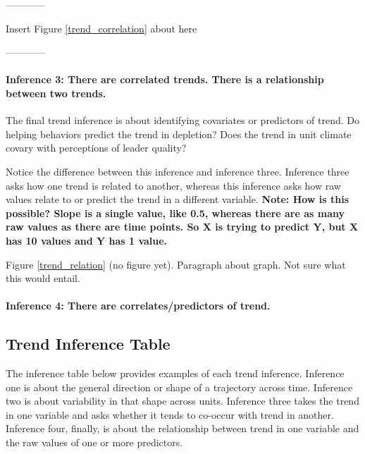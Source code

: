 \documentclass[english,,man]{apa6}
\let\oldparagraph\paragraph
\renewcommand{\paragraph}[1]{\oldparagraph{#1}\mbox{}}
\theoremstyle{definition}
\theoremstyle{definition}
\theoremstyle{definition}
\theoremstyle{remark}
\begin{document}
\begin{center}

------------

Insert Figure \ref{trend_correlation} about here

------------

\end{center}

\hypertarget{inference-3-there-are-correlated-trends.-there-is-a-relationship-between-two-trends.}{%
\paragraph{Inference 3: There are correlated trends. There is a
relationship between two
trends.}\label{inference-3-there-are-correlated-trends.-there-is-a-relationship-between-two-trends.}}

The final trend inference is about identifying covariates or predictors
of trend. Do helping behaviors predict the trend in depletion? Does the
trend in unit climate covary with perceptions of leader quality?

Notice the difference between this inference and inference three.
Inference three asks how one trend is related to another, whereas this
inference asks how raw values relate to or predict the trend in a
different variable. \textbf{Note: How is this possible? Slope is a
single value, like 0.5, whereas there are as many raw values as there
are time points. So X is trying to predict Y, but X has 10 values and Y
has 1 value.}

Figure \ref{trend_relation} (no figure yet). Paragraph about graph. Not
sure what this would entail.

\hypertarget{inference-4-there-are-correlatespredictors-of-trend.}{%
\paragraph{Inference 4: There are correlates/predictors of
trend.}\label{inference-4-there-are-correlatespredictors-of-trend.}}

\hypertarget{trend-inference-table}{%
\subsection{Trend Inference Table}\label{trend-inference-table}}

The inference table below provides examples of each trend inference.
Inference one is about the general direction or shape of a trajectory
across time. Inference two is about variability in that shape across
units. Inference three takes the trend in one variable and asks whether
it tends to co-occur with trend in another. Inference four, finally, is
about the relationship between trend in one variable and the raw values
of one or more predictors.
\end{document}
